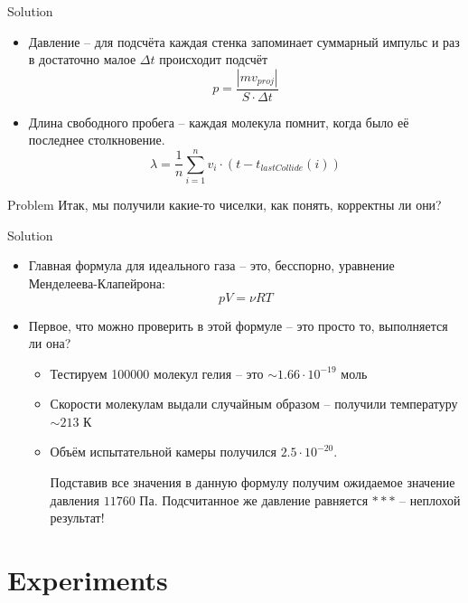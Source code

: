 \documentclass{beamer}
\begin{document}
\begin{frame}{Solution}
  \begin{itemize}
    \item<1-> Давление -- для подсчёта каждая стенка запоминает суммарный импульс и раз в достаточно малое $\Delta t$ происходит подсчёт
    \[
      p = \frac{|mv_{proj}|}{S\cdot\Delta t}
    \]
    \item<2-> Длина свободного пробега -- каждая молекула помнит, когда было её последнее столкновение. 
    \[
      \lambda = \frac{1}{n}\sum_{i = 1}^n v_i\cdot(t - t_{lastCollide}(i))
    \]
  \end{itemize}
\end{frame}

\begin{frame}{Problem}
  Итак, мы получили какие-то чиселки, как понять, корректны ли они? 
\end{frame}

\begin{frame}{Solution}
  \begin{itemize}
    \item<1-> Главная формула для идеального газа -- это, бесспорно, уравнение Менделеева-Клапейрона:
    \[
      pV = \nu R T
    \]
    \item<2-> Первое, что можно проверить в этой формуле -- это просто то, выполняется ли она?
      \begin{itemize}
        \item Тестируем 100000 молекул гелия -- это $\sim 1.66 \cdot 10^{-19}$ моль
        \item Скорости молекулам выдали случайным образом -- получили температуру $\sim 213$ К
        \item Объём испытательной камеры получился $2.5\cdot 10^{-20}$.
        
        Подставив все значения в данную формулу получим ожидаемое значение давления $11760$ Па. Подсчитанное же давление равняется $***$ -- неплохой результат!
      \end{itemize}
  \end{itemize}
\end{frame}

\section{Experiments}
\end{document}
